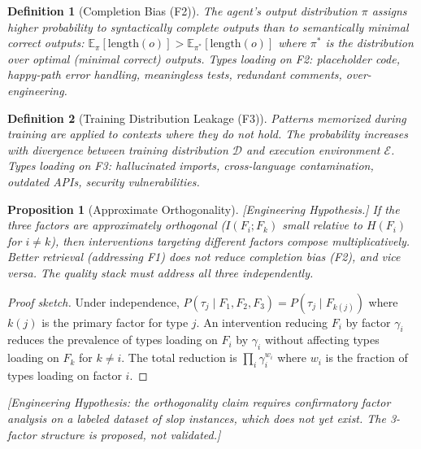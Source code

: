 \documentclass[11pt, a4paper, logo, copyright]{googledeepmind}
\newtheorem{definition}{Definition}[section]
\newtheorem{proposition}{Proposition}[section]
\newcommand{\E}{\mathbb{E}}
\begin{document}
\begin{definition}[Completion Bias (F2)]
\label{def:f2}
The agent's output distribution $\pi$ assigns higher probability to syntactically complete outputs than to semantically minimal correct outputs: $\E_\pi[\mathrm{length}(o)] > \E_{\pi^*}[\mathrm{length}(o)]$ where $\pi^*$ is the distribution over optimal (minimal correct) outputs. Types loading on F2: placeholder code, happy-path error handling, meaningless tests, redundant comments, over-engineering.
\end{definition}

\begin{definition}[Training Distribution Leakage (F3)]
\label{def:f3}
Patterns memorized during training are applied to contexts where they do not hold. The probability increases with divergence between training distribution $\mathcal{D}$ and execution environment $\mathcal{E}$. Types loading on F3: hallucinated imports, cross-language contamination, outdated APIs, security vulnerabilities.
\end{definition}

\begin{proposition}[Approximate Orthogonality]
\label{prop:orthogonality}
\emph{[Engineering Hypothesis.]} If the three factors are approximately orthogonal ($I(F_i; F_k)$ small relative to $H(F_i)$ for $i \neq k$), then interventions targeting different factors compose multiplicatively. Better retrieval (addressing F1) does not reduce completion bias (F2), and vice versa. The quality stack must address all three independently.
\end{proposition}

\begin{proof}[Proof sketch]
Under independence, $P(\tau_j \mid F_1, F_2, F_3) = P(\tau_j \mid F_{k(j)})$ where $k(j)$ is the primary factor for type $j$. An intervention reducing $F_i$ by factor $\gamma_i$ reduces the prevalence of types loading on $F_i$ by $\gamma_i$ without affecting types loading on $F_k$ for $k \neq i$. The total reduction is $\prod_i \gamma_i^{w_i}$ where $w_i$ is the fraction of types loading on factor $i$.
\end{proof}

\emph{[Engineering Hypothesis: the orthogonality claim requires confirmatory factor analysis on a labeled dataset of slop instances, which does not yet exist. The 3-factor structure is proposed, not validated.]}


\end{document}

